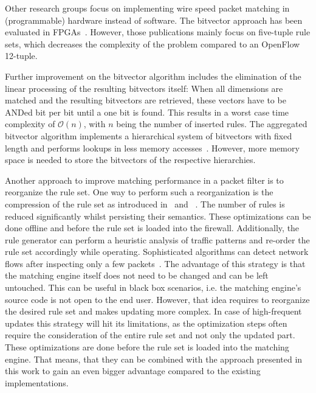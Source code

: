 \documentclass[a4paper,
		12pt,
		parskip=full,
		titlepage
		]{scrartcl}
\begin{document}
Other research groups focus on implementing wire speed packet matching in (programmable) hardware instead of software.
The bitvector approach has been evaluated in FPGAs~\cite{bitvector_fpga, qu2013fast}.
However, those publications mainly focus on five-tuple rule sets, which decreases 
the complexity of the problem compared to an OpenFlow 12-tuple.

Further improvement on the bitvector algorithm includes the elimination of the linear processing of the resulting bitvectors itself:
When all dimensions are matched and the resulting bitvectors are retrieved, 
these vectors have to be ANDed bit per bit until a one bit is found.
This results in a worst case time complexity of $\mathcal O(n)$, with $n$ being the number of inserted rules.
The aggregated bitvector algorithm implements a hierarchical system 
of bitvectors with fixed length and performs lookups in less memory accesses~\cite{abv}.
However, more memory space is needed to store the bitvectors of the respective hierarchies.

Another approach to improve matching performance in a packet filter is to reorganize the rule set.
One way to perform such a reorganization is the compression of the rule set as 
introduced in~\cite{redundancy_removal} and ~\cite{firewall_compressor}.
The number of rules is reduced significantly whilst persisting their semantics.
These optimizations can be done offline and before the rule set is loaded into the firewall.
Additionally, the rule generator can perform a heuristic analysis of  
traffic patterns and re-order the rule set accordingly while operating.
Sophisticated algorithms can detect network flows after inspecting only a few packets~\cite{trafficonthefly}.
The advantage of this strategy is that the matching engine itself does not need to be changed and can be left untouched.
This can be useful in black box scenarios, i.e. the matching engine's source code is not open to the end user.
However, that idea requires to reorganize the desired rule set and makes updating more complex.
In case of high-frequent updates this strategy will hit its limitations, 
as the optimization steps often require the consideration of the entire rule set and not only the updated part.
These optimizations are done before the rule set is loaded into the matching engine.
That means, that they can be combined with the approach presented in this work to
gain an even bigger advantage compared to the existing implementations.
\end{document}
